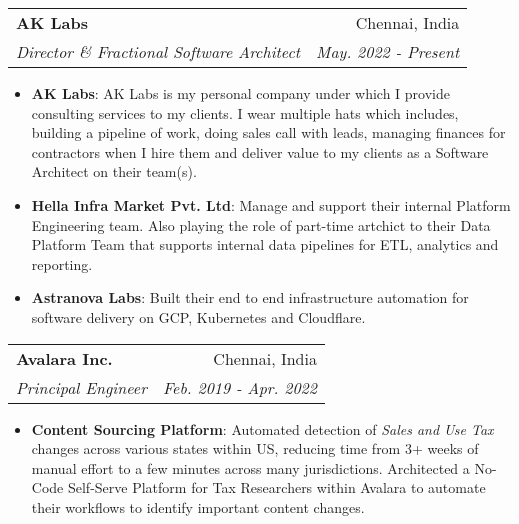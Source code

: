 \documentclass[letterpaper,11pt]{article}
\makeatletter
\newcommand{\resumeItem}[2]{
  \item\small{
    \textbf{#1}{: #2 \vspace{-2pt}}
  }
}
\newcommand{\resumeSubheading}[4]{
  \vspace{-1pt}\item
    \begin{tabular*}{0.97\textwidth}[t]{l@{\extracolsep{\fill}}r}
      \textbf{#1} & #2 \\
      \textit{\small#3} & \textit{\small #4} \\
    \end{tabular*}\vspace{-5pt}
}
\newcommand{\resumeItemListStart}{\begin{itemize}}
\newcommand{\resumeItemListEnd}{\end{itemize}\vspace{-5pt}}
\makeatother
\begin{document}
    \resumeSubheading
      {AK Labs}{Chennai, India}
      {Director \& Fractional Software Architect}{May. 2022 - Present}
      \resumeItemListStart
        \resumeItem{AK Labs}
          {
            AK Labs is my personal company under which I provide consulting services to my clients. I wear multiple hats which includes, building a pipeline of work, doing sales call with leads, managing finances for contractors when I hire them and deliver value to my clients as a Software Architect on their team(s).
          }
        \resumeItem{Hella Infra Market Pvt. Ltd}
          {
            Manage and support their internal Platform Engineering team. Also playing the role of part-time artchict to their Data Platform Team that supports internal data pipelines for ETL, analytics and reporting.
          }
        \resumeItem{Astranova Labs}
          {
            Built their end to end infrastructure automation for software delivery on GCP, Kubernetes and Cloudflare.
          }
      \resumeItemListEnd

    \resumeSubheading
      {Avalara Inc.}{Chennai, India}
      {Principal Engineer}{Feb. 2019 - Apr. 2022}
      \resumeItemListStart
        \resumeItem{Content Sourcing Platform}
          {
            Automated detection of \textit{Sales and Use Tax} changes across various states within US, reducing time from 3+ weeks of manual
            effort to a few minutes across many jurisdictions. Architected a No-Code Self-Serve Platform for Tax Researchers within Avalara
            to automate their workflows to identify important content changes.
          }
      \resumeItemListEnd
\end{document}
